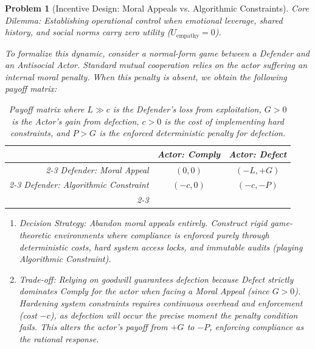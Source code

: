 \documentclass{article}
\newtheorem{problem}{Problem}
\begin{document}
\begin{problem}[Incentive Design: Moral Appeals vs. Algorithmic Constraints]
	\emph{Core Dilemma:} Establishing operational control when emotional leverage, shared history, and social norms carry zero utility ($U_{\text{empathy}} = 0$).
	
	To formalize this dynamic, consider a normal-form game between a Defender and an Antisocial Actor. Standard mutual cooperation \cite{axelrod1984evolution} relies on the actor suffering an internal moral penalty. When this penalty is absent, we obtain the following payoff matrix:
	
	\begin{table}[H]
		\centering
		\renewcommand{\arraystretch}{1.5}
		\begin{tabular}{r|c|c|}
			\multicolumn{1}{c}{} & \multicolumn{1}{c}{\emph{Actor: Comply}} & \multicolumn{1}{c}{\emph{Actor: Defect}} \\ \cline{2-3}
			\emph{Defender: Moral Appeal} & $(0, 0)$ & $(-L, +G)$ \\ \cline{2-3}
			\emph{Defender: Algorithmic Constraint} & $(-c, 0)$ & $(-c, -P)$ \\ \cline{2-3}
		\end{tabular}
		\caption{Payoff matrix where $L \gg c$ is the Defender's loss from exploitation, $G > 0$ is the Actor's gain from defection, $c > 0$ is the cost of implementing hard constraints, and $P > G$ is the enforced deterministic penalty for defection.}
	\end{table}
	
	\begin{enumerate}[label=(\roman*)]
		\item \emph{Decision Strategy:} Abandon moral appeals entirely. Construct rigid game-theoretic environments where compliance is enforced purely through deterministic costs, hard system access locks, and immutable audits (playing \emph{Algorithmic Constraint}).
		\item \emph{Trade-off:} Relying on goodwill guarantees defection because \emph{Defect} strictly dominates \emph{Comply} for the actor when facing a \emph{Moral Appeal} (since $G > 0$). Hardening system constraints requires continuous overhead and enforcement (cost $-c$), as defection will occur the precise moment the penalty condition fails. This alters the actor's payoff from $+G$ to $-P$, enforcing compliance as the rational response.
	\end{enumerate}
\end{problem}
\end{document}
